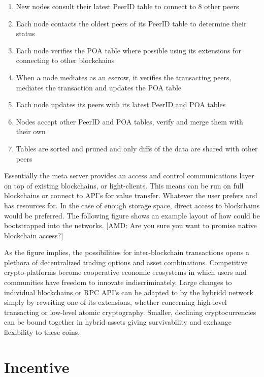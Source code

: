 \documentclass[a4paper]{article}
\begin{document}
\begin{enumerate}
\item New nodes consult their latest PeerID table to connect to 8 other peers
\item Each node contacts the oldest peers of its PeerID table to determine their status
\item Each node verifies the POA table where possible using its extensions
	    for connecting to other blockchains
\item When a node mediates as an escrow, it verifies the transacting peers,
	    mediates the transaction and updates the POA table
\item Each node updates its peers with its latest PeerID and POA tables
\item Nodes accept other PeerID and POA tables, verify and merge them with their own
\item Tables are sorted and pruned and only diffs of the data are shared with other peers
\end{enumerate}

Essentially the meta server provides an access and control communications layer on top of existing blockchains, or light-clients. This means \hybridd can be run on full blockchains or connect to API's for value transfer. Whatever the user prefers and has resources for. In the case of enough storage space, direct access to blockchains would be preferred. The following figure shows an example layout of how \hybridd could be bootstrapped into the networks. [AMD: Are you sure you want to promise native blockchain access?]

As the figure implies, the possibilities for inter-blockchain transactions opens a plethora of decentralized trading options and asset combinations. Competitive crypto-platforms become cooperative economic ecosystems in which users and communities have freedom to innovate indiscriminately. Large changes to individual blockchains or RPC API's can be adapted to by the hybridd network simply by rewriting one of its extensions, whether concerning high-level transacting or low-level atomic cryptography. Smaller, declining cryptocurrencies can be bound together in hybrid assets giving survivability and exchange flexibility to these coins.

\section{Incentive}
\end{document}
